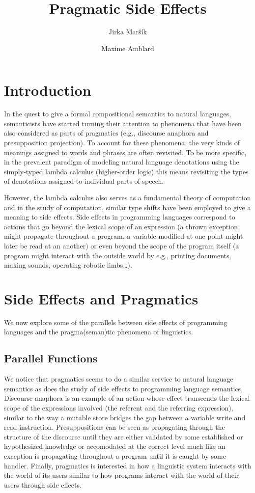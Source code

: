 \documentclass[a4paper,11pt,DIV=12]{scrartcl}
\title{Pragmatic Side Effects}
\author{Jirka Maršík \and Maxime Amblard}
\begin{document}
\maketitle

\section{Introduction}

In the quest to give a formal compositional semantics to natural languages,
semanticists have started turning their attention to phenomena that have
been also considered as parts of pragmatics (e.g., discourse anaphora and
presupposition projection). To account for these phenomena, the very kinds
of meanings assigned to words and phrases are often revisited. To be more
specific, in the prevalent paradigm of modeling natural language
denotations using the simply-typed lambda calculus (higher-order logic)
this means revisiting the types of denotations assigned to individual parts
of speech.

However, the lambda calculus also serves as a fundamental theory of
computation and in the study of computation, similar type shifts have been
employed to give a meaning to side effects. Side effects in programming
languages correspond to actions that go beyond the lexical scope of an
expression (a thrown exception might propagate throughout a program, a
variable modified at one point might later be read at an another) or even
beyond the scope of the program itself (a program might interact with the
outside world by e.g., printing documents, making sounds, operating robotic
limbs\ldots).

\section{Side Effects and Pragmatics}

We now explore some of the parallels between side effects of programming
languages and the pragma(seman)tic phenomena of linguistics.

\subsection{Parallel Functions}

We notice that pragmatics seems to do a similar service to natural language
semantics as does the study of side effects to programming language
semantics. Discourse anaphora is an example of an action whose effect
transcends the lexical scope of the expressions involved (the referent and
the referring expression), similar to the way a mutable store bridges the
gap between a variable write and read instruction. Presuppositions can be
seen as propagating through the structure of the discourse until they are
either validated by some established or hypothesized knowledge or
accomodated at the correct level much like an exception is propagating
throughout a program until it is caught by some handler. Finally,
pragmatics is interested in how a linguistic system interacts with the
world of its users similar to how programs interact with the world of their
users through side effects.
\end{document}
